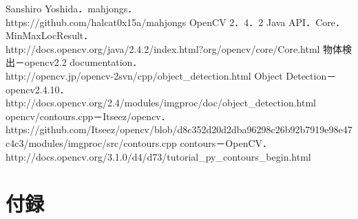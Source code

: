 \documentclass{jsarticle}
\begin{document}
\begin{thebibliography}{9}
	Sanshiro Yoshida．mahjongs．\\
	https://github.com/halcat0x15a/mahjongs
	OpenCV 2．4．2 Java API．Core．MinMaxLocResult．\\
	http://docs.opencv.org/java/2.4.2/index.html?org/opencv/core/Core.html
	物体検出－opencv2.2 documentation． \\
	http://opencv.jp/opencv-2svn/cpp/object\_detection.html
	Object Detection－opencv2.4.10．\\
	http://docs.opencv.org/2.4/modules/imgproc/doc/object\_detection.html
	opencv/contours.cpp－Itseez/opencv． \\
	https://github.com/Itseez/opencv/blob/d8c352d20d2dba96298c26b92b7919e98e47c4c3/modules/imgproc/src/contours.cpp
   contours－OpenCV． \\
   http://docs.opencv.org/3.1.0/d4/d73/tutorial\_py\_contours\_begin.html
\end{thebibliography}



\newpage

\section{付録}
\end{document}
